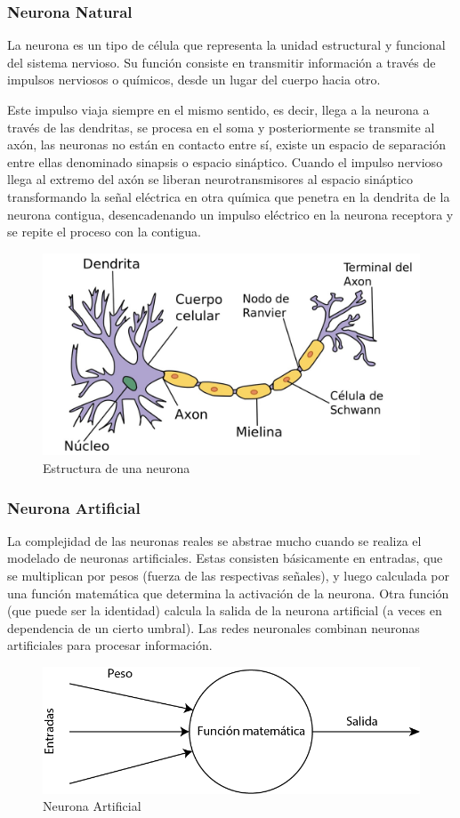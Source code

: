 \documentclass[12pt, a4paper, titlepage]{report}
\begin{document}
				\subsubsection{Neurona Natural}
				La neurona es un tipo de célula que representa la unidad estructural y funcional del sistema nervioso. Su función consiste en transmitir información a través de impulsos nerviosos o químicos, desde un lugar del cuerpo hacia otro.\par
				Este impulso viaja siempre en el mismo sentido, es decir, llega a la neurona a través de las dendritas, se procesa en el soma y posteriormente se transmite al axón, las neuronas no están en contacto entre sí, existe un espacio de separación entre ellas denominado sinapsis o espacio sináptico. Cuando el impulso nervioso llega al extremo del axón se liberan neurotransmisores al espacio sináptico transformando la señal eléctrica en otra química que penetra en la dendrita de la neurona contigua, desencadenando un impulso eléctrico en la neurona receptora y se repite el proceso con la contigua.\cite{refNeuronaNat}
				\begin{figure}[H] \caption{Estructura de una neurona}
					\includegraphics[width=12cm]{./imagenes/MarcoTeorico/Neurona.jpg}
					\centering 
				\end{figure}			
				\subsubsection{Neurona Artificial}
				La complejidad de las neuronas reales se abstrae mucho cuando se realiza el modelado de neuronas artificiales. Estas consisten básicamente en entradas, que se multiplican por pesos (fuerza de las respectivas señales), y luego calculada por una función matemática que determina la activación de la neurona. Otra función (que puede ser la identidad) calcula la salida de la neurona artificial (a veces en dependencia de un cierto umbral). Las redes neuronales combinan neuronas artificiales para procesar información.\cite{refNeuronaArt}
				\begin{figure}[H] \caption{Neurona Artificial}
					\includegraphics[width=12cm]{./imagenes/MarcoTeorico/NeuronaArt.png}
					\centering 
				\end{figure}
\end{document}

